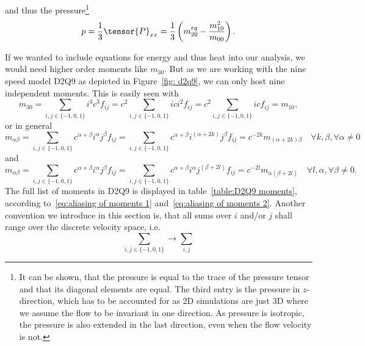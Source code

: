 and thus the pressure\footnote{It can be shown, that the pressure is equal to the trace of the pressure tensor and that its diagonal elements are equal. The third entry is the pressure in $z$-direction, which has to be accounted for as 2D simulations are just 3D where we assume the flow to be invariant in one direction. As pressure is isotropic, the pressure is also extended in the last direction, even when the flow velocity is not.}
\begin{equation}
  p=\frac{1}{3} \tensor{P}_{xx} = \frac{1}{3} \left(m_{20}^{eq} - \frac{m_{10}^2}{m_{00}}\right).
\end{equation}

If we wanted to include equations for energy and thus heat into our analysis, we would need higher order moments like $m_{30}$.
But as we are working with the nine speed model D2Q9 as depicted in Figure~\ref{fig: d2q9}, we can only host nine independent moments.
This is easily seen with
\begin{equation}
  m_{30} = \sum_{i,j \in \{-1,0,1\}} i^3 c^3 f_{ij} = c^2\sum_{i,j \in \{-1,0,1\}} ic i^2 f_{ij} = c^2 \sum_{i,j \in \{-1,0,1\}} ic f_{ij} = m_{10},
\end{equation}
or in general
\begin{equation}
  \label{eq:aliasing of moments 1}
  m_{\alpha\beta}
  = \sum_{i,j \in \{-1,0,1\}} c^{\alpha+\beta} i^\alpha j^\beta f_{ij}
  = \sum_{i,j \in \{-1,0,1\}} c^{\alpha+\beta}i^{(\alpha+2k)} j^\beta f_{ij}
  = c^{-2k} m_{(\alpha+2k)\beta} \quad \forall k,\beta, \forall \alpha \neq 0
\end{equation}
and
\begin{equation}
  \label{eq:aliasing of moments 2}
  m_{\alpha\beta}
  = \sum_{i,j \in \{-1,0,1\}} c^{\alpha+\beta} i^\alpha j^\beta f_{ij}
  = \sum_{i,j \in \{-1,0,1\}} c^{\alpha+\beta}i^\alpha j^{(\beta+2l)} f_{ij}
  = c^{-2l}m_{\alpha(\beta+2l)} \quad \forall l, \alpha, \forall \beta \neq 0.
\end{equation}
The full list of moments in D2Q9 is displayed in table~\ref{table:D2Q9 moments}, according to~\eqref{eq:aliasing of moments 1} and~\eqref{eq:aliasing of moments 2}.
Another convention we introduce in this section is, that all sums over $i$ and/or $j$ shall range over the discrete velocity space, i.e.
\begin{equation*}
  \sum_{i,j \in \{-1,0,1\}} \rightarrow \sum_{i,j}
\end{equation*}

